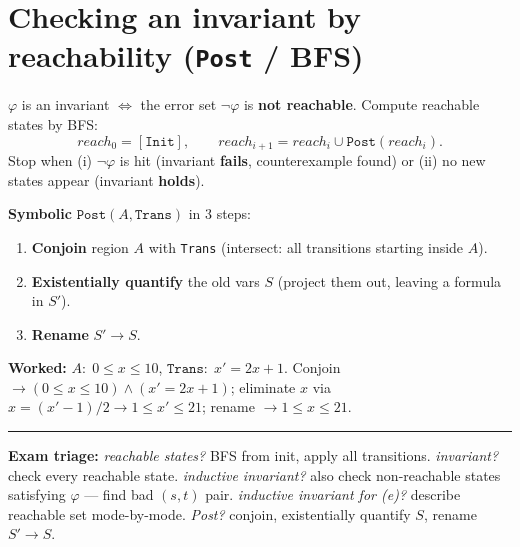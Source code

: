 \section{Checking an invariant by reachability (\texttt{Post} / BFS)}
$\varphi$ is an invariant $\iff$ the error set $\neg\varphi$ is \textbf{not reachable}. Compute reachable states by BFS:
\[
reach_0=[\texttt{Init}],\qquad reach_{i+1}=reach_i\cup\texttt{Post}(reach_i).
\]
Stop when (i) $\neg\varphi$ is hit (invariant \textbf{fails}, counterexample found) or (ii) no new states appear (invariant \textbf{holds}).

\begin{keybox}
\textbf{Symbolic} $\texttt{Post}(A,\texttt{Trans})$ in 3 steps:
\begin{enumerate}
  \item \textbf{Conjoin} region $A$ with \texttt{Trans} (intersect: all transitions starting inside $A$).
  \item \textbf{Existentially quantify} the old vars $S$ (project them out, leaving a formula in $S'$).
  \item \textbf{Rename} $S'\to S$.
\end{enumerate}
\end{keybox}
\textbf{Worked:} $A:\;0\le x\le 10$, $\texttt{Trans}:\;x'=2x+1$. Conjoin $\to (0\le x\le 10)\wedge(x'=2x+1)$; eliminate $x$ via $x=(x'-1)/2 \to 1\le x'\le 21$; rename $\to \boxed{1\le x\le 21}$.

\vspace{4pt}
\hrule
\vspace{2pt}
{\footnotesize\textbf{Exam triage:} \emph{reachable states?} BFS from init, apply all transitions. \emph{invariant?} check every reachable state. \emph{inductive invariant?} also check non-reachable states satisfying $\varphi$ --- find bad $(s,t)$ pair. \emph{inductive invariant for (e)?} describe reachable set mode-by-mode. \emph{Post?} conjoin, existentially quantify $S$, rename $S'{\to}S$.}
